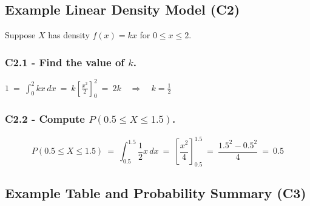 	\subsection{Example Linear Density Model (C2)}
	\label{sec:example-linear-density-model-c2}
	
	Suppose $X$ has density $f(x)=kx$ for $0\le x\le 2$.
	
	
	\subsubsection*{C2.1 - Find the value of $k$.}
	\label{subsec:example-linear-density-model-c2-a}
	
	\begin{minipage}[t]{0.54\textwidth}
		\vspace{0pt}
		\centering
		
		\(\displaystyle
		1
		\> = \> \int_0^2 kx\,dx
		\> = \> k\left[\frac{x^2}{2}\right]_0^2
		\> = \> 2k
		\quad\Rightarrow\quad
		k=\frac12
		\)
	\end{minipage}
	\hfill
	\begin{minipage}[t]{0.42\textwidth}
		\vspace{0pt}
		\centering
	\end{minipage}
	
	
	\subsubsection*{C2.2 - Compute $P(0.5\le X\le 1.5)$.}
	\label{subsec:example-linear-density-model-c2-b}
	
	\[
	P(0.5\le X\le 1.5)
	\> = \> \int_{0.5}^{1.5}\frac12 x\,dx
	\> = \> \left[\frac{x^2}{4}\right]_{0.5}^{1.5}
	\> = \> \frac{1.5^2-0.5^2}{4}
	\> = \> 0.5
	\]
	
	
	\subsection{Example Table and Probability Summary (C3)}
	\label{sec:example-table-and-probability-summary-c3}
	
